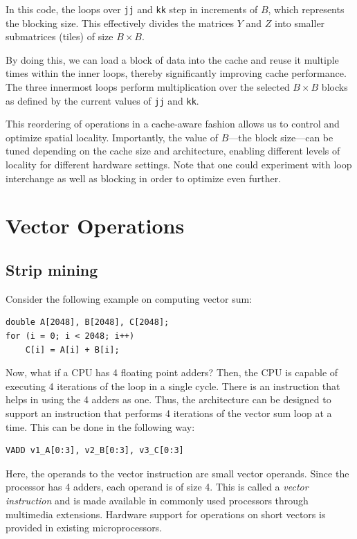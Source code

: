 \documentclass[12pt]{book}
\begin{document}
In this code, the loops over \texttt{jj} and \texttt{kk} step in increments of $B$, which represents the blocking size. This effectively divides the matrices $Y$ and $Z$ into smaller submatrices (tiles) of size $B \times B$. 

By doing this, we can load a block of data into the cache and reuse it multiple times within the inner loops, thereby significantly improving cache performance. The three innermost loops perform multiplication over the selected $B \times B$ blocks as defined by the current values of \texttt{jj} and \texttt{kk}. 

This reordering of operations in a cache-aware fashion allows us to control and optimize spatial locality. Importantly, the value of $B$—the block size—can be tuned depending on the cache size and architecture, enabling different levels of locality for different hardware settings. Note that one could experiment with loop interchange as well as blocking in order to optimize even further.

\section{Vector Operations}
\subsection{Strip mining}
Consider the following example on computing vector sum:
\begin{lstlisting}
double A[2048], B[2048], C[2048];
for (i = 0; i < 2048; i++) 
    C[i] = A[i] + B[i];
\end{lstlisting}

Now, what if a CPU has 4 floating point adders? Then, the CPU is capable of executing 4 iterations of the loop in a single cycle. There is an instruction that helps in using the 4 adders as one. Thus, the architecture can be designed to support an instruction that performs 4 iterations of the vector sum loop at a time. This can be done in the following way:

\begin{lstlisting}
VADD v1_A[0:3], v2_B[0:3], v3_C[0:3]
\end{lstlisting}

Here, the operands to the vector instruction are small vector operands. Since the processor has 4 adders, each operand is of size 4. This is called a \textit{vector instruction} and is made available in commonly used processors through multimedia extensions. Hardware support for operations on short vectors is provided in existing microprocessors.
\end{document}
